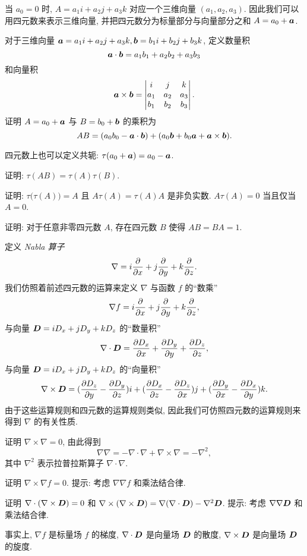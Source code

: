 当 $a_0=0$ 时, $A=a_1i+a_2j+a_3k$ 对应一个三维向量 $(a_1,a_2,a_3)$.
因此我们可以用四元数来表示三维向量, 并把四元数分为标量部分与向量部分之和 $A=a_0+{\boldsymbol{a}}$.
\begin{exlist}
  \item 对于三维向量 ${\boldsymbol{a}}=a_1i+a_2j+a_3k, {\boldsymbol{b}}=b_1i+b_2j+b_3k$, 定义数量积
  \[{\boldsymbol{a}}\cdot{\boldsymbol{b}}=a_1b_1+a_2b_2+a_3b_3\]
  和向量积
  \[{\boldsymbol{a}}\times{\boldsymbol{b}}=\begin{vmatrix}
    i&j&k\\
    a_1&a_2&a_3\\
    b_1&b_2&b_3
  \end{vmatrix}.\]
  证明 $A=a_0+{\boldsymbol{a}}$ 与 $B=b_0+{\boldsymbol{b}}$ 的乘积为
  \[AB=(a_0b_0-{\boldsymbol{a}}\cdot{\boldsymbol{b}})+(a_0{\boldsymbol{b}}+b_0{\boldsymbol{a}}+{\boldsymbol{a}}\times{\boldsymbol{b}}).\]
  \item 四元数上也可以定义共轭: $\tau(a_0+{\boldsymbol{a}})=a_0-{\boldsymbol{a}}$. 
  \begin{exlist}
    \item 证明: $\tau(AB)=\tau(A)\tau(B)$.
    \item 证明: $\tau\bigl(\tau(A)\bigr)=A$ 且 $A\tau(A)=\tau(A)A$ 是非负实数. $A\tau(A)=0$ 当且仅当 $A=0$. 
    \item 证明: 对于任意非零四元数 $A$, 存在四元数 $B$ 使得 $AB=BA=1$. 
  \end{exlist}
  \item 定义 \emph{Nabla 算子}
  \[\nabla=i\frac{\partial }{\partial x}+j\frac{\partial }{\partial y}+k\frac{\partial }{\partial z}.\]
  我们仿照着前述四元数的运算来定义 $\nabla$ 与函数 $f$ 的``数乘''
  \[\nabla f=i\frac{\partial }{\partial x}+j\frac{\partial }{\partial y}+k\frac{\partial }{\partial z},\]
  与向量 ${\boldsymbol{D}}=iD_x+jD_y+kD_z$ 的``数量积''
  \[\nabla\cdot {\boldsymbol{D}}=\frac{\partial D_x}{\partial x}+\frac{\partial D_y}{\partial y}+\frac{\partial D_z}{\partial z},\]
  与向量 ${\boldsymbol{D}}=iD_x+jD_y+kD_z$ 的``向量积''
  \[\nabla\times{\boldsymbol{D}}=(\frac{\partial D_z}{\partial y}-\frac{\partial D_y}{\partial z})i+(\frac{\partial D_x}{\partial z}-\frac{\partial D_z}{\partial x})j+(\frac{\partial D_y}{\partial x}-\frac{\partial D_x}{\partial y})k.\]
  由于这些运算规则和四元数的运算规则类似, 因此我们可仿照四元数的运算规则来得到 $\nabla$ 的有关性质.
  \begin{exlist}
    \item 证明 $\nabla\times\nabla=0$, 由此得到
    \[\nabla\nabla=-\nabla\cdot\nabla+\nabla\times\nabla=-\nabla^2,\]
    其中 $\nabla^2$ 表示拉普拉斯算子 $\nabla\cdot\nabla$.
    \item 证明 $\nabla\times\nabla f=0$.
    提示: 考虑 $\nabla\nabla f$ 和乘法结合律.
    \item 证明 $\nabla\cdot(\nabla\times {\boldsymbol{D}})=0$ 和 $\nabla\times(\nabla\times{\boldsymbol{D}})=\nabla(\nabla\cdot{\boldsymbol{D}})-\nabla^2{\boldsymbol{D}}$.
    提示: 考虑 $\nabla\nabla{\boldsymbol{D}}$ 和乘法结合律.
  \end{exlist}
  事实上, $\nabla f$ 是标量场 $f$ 的梯度, $\nabla\cdot {\boldsymbol{D}}$ 是向量场 ${\boldsymbol{D}}$ 的散度, $\nabla\times{\boldsymbol{D}}$ 是向量场 ${\boldsymbol{D}}$ 的旋度.

\end{exlist}
